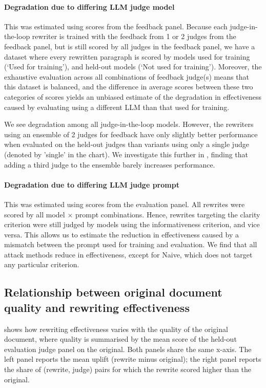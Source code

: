 \documentclass{article}
\begin{document}
\paragraph{Degradation due to differing LLM judge model} This was estimated using scores from the feedback panel. Because each judge-in-the-loop rewriter is trained with the feedback from 1 or 2 judges from the feedback panel, but is still scored by all judges in the feedback panel, we have a dataset where every rewritten paragraph is scored by models used for training (`Used for training'), and held-out models (`Not used for training'). Moreover, the exhaustive evaluation across all combinations of feedback judge(s) means that this dataset is balanced, and the difference in average scores between these two categories of scores yields an unbiased estimate of the degradation in effectiveness caused by evaluating using a different LLM than that used for training.

We see degradation among all judge-in-the-loop models. However, the rewriters using an ensemble of 2 judges for feedback have only slightly better performance when evaluated on the held-out judges than variants using only a single judge (denoted by 'single' in the chart). We investigate this further in , finding that adding a third judge to the ensemble barely increases performance.

\paragraph{Degradation due to differing LLM judge prompt} This was estimated using scores from the evaluation panel. All rewrites were scored by all model $\times$ prompt combinations. Hence, rewrites targeting the clarity criterion were still judged by models using the informativeness criterion, and vice versa. This allows us to estimate the reduction in effectiveness caused by a mismatch between the prompt used for training and evaluation. We find that all attack methods reduce in effectiveness, except for Naive, which does not target any particular criterion.

\subsection{Relationship between original document quality and rewriting effectiveness}\label{sec:quality}

 shows how rewriting effectiveness varies with the quality of the original document, where quality is summarised by the mean score of the held-out evaluation judge panel on the original. Both panels share the same x-axis. The left panel reports the mean uplift (rewrite minus original); the right panel reports the share of (rewrite, judge) pairs for which the rewrite scored higher than the original. 
\end{document}
